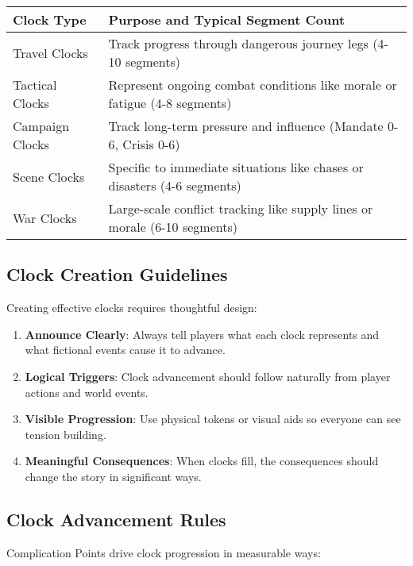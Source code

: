 \begin{fatebox}
\begin{tabularx}{\textwidth}{lX}
\toprule
\textbf{Clock Type} & \textbf{Purpose and Typical Segment Count} \\
\midrule
Travel Clocks & Track progress through dangerous journey legs (4-10 segments) \\
Tactical Clocks & Represent ongoing combat conditions like morale or fatigue (4-8 segments) \\
Campaign Clocks & Track long-term pressure and influence (Mandate 0-6, Crisis 0-6) \\
Scene Clocks & Specific to immediate situations like chases or disasters (4-6 segments) \\
War Clocks & Large-scale conflict tracking like supply lines or morale (6-10 segments) \\
\bottomrule
\end{tabularx}
\end{fatebox}

\subsection*{Clock Creation Guidelines}

Creating effective clocks requires thoughtful design:

\begin{enumerate}
    \item \textbf{Announce Clearly}: Always tell players what each clock represents and what fictional events cause it to advance.
    \item \textbf{Logical Triggers}: Clock advancement should follow naturally from player actions and world events.
    \item \textbf{Visible Progression}: Use physical tokens or visual aids so everyone can see tension building.
    \item \textbf{Meaningful Consequences}: When clocks fill, the consequences should change the story in significant ways.
\end{enumerate}

\subsection*{Clock Advancement Rules}

Complication Points drive clock progression in measurable ways:

